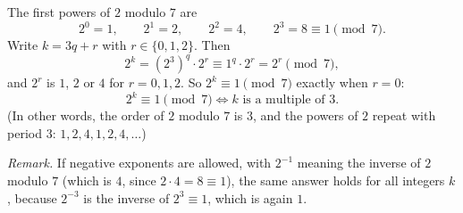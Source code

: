 The first powers of $2$ modulo $7$ are
\[2^0=1,\qquad 2^1=2,\qquad 2^2=4,\qquad 2^3=8\equiv1\pmod7 .\]
Write $k=3q+r$ with $r\in\{0,1,2\}$. Then
\[2^k=\left(2^3\right)^q\cdot2^r\equiv1^q\cdot2^r=2^r\pmod7,\]
and $2^r$ is $1$, $2$ or $4$ for $r=0,1,2$. So $2^k\equiv1\pmod7$ exactly when $r=0$:
\[\boxed{2^k\equiv1\pmod7\iff k\text{ is a multiple of }3.}\]
(In other words, the order of $2$ modulo $7$ is $3$, and the powers of $2$ repeat with period $3$: $1,2,4,1,2,4,\dots$)

\emph{Remark.} If negative exponents are allowed, with $2^{-1}$ meaning the inverse of $2$ modulo $7$ (which is $4$, since $2\cdot4=8\equiv1$), the same answer holds for all integers $k$, because $2^{-3}$ is the inverse of $2^3\equiv1$, which is again $1$.
